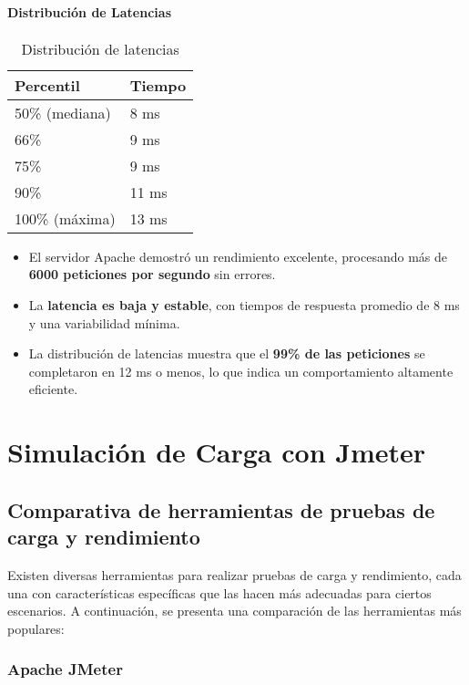 \paragraph{Distribución de Latencias}

\begin{table}[H]
\centering
\begin{tabular}{|l|l|}
\hline
\textbf{Percentil} & \textbf{Tiempo} \\ \hline
50\% (mediana) & 8 ms \\ \hline
66\% & 9 ms \\ \hline
75\% & 9 ms \\ \hline
90\% & 11 ms \\ \hline
100\% (máxima) & 13 ms \\ \hline
\end{tabular}
\caption{Distribución de latencias}
\end{table}


\begin{itemize}
    \item El servidor Apache demostró un rendimiento excelente, procesando más de \textbf{6000 peticiones por segundo} sin errores.
    \item La \textbf{latencia es baja y estable}, con tiempos de respuesta promedio de 8 ms y una variabilidad mínima.
    \item La distribución de latencias muestra que el \textbf{99\% de las peticiones} se completaron en 12 ms o menos, lo que indica un comportamiento altamente eficiente.
\end{itemize}

\section{Simulación de Carga con Jmeter}

\subsection{Comparativa de herramientas de pruebas de carga y rendimiento}

Existen diversas herramientas para realizar pruebas de carga y rendimiento, cada una con características específicas que las hacen más adecuadas para ciertos escenarios. A continuación, se presenta una comparación de las herramientas más populares:

\subsubsection{Apache JMeter}

